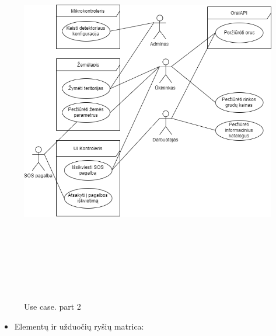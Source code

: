 \documentclass[oneside]{VUMIFPSkursinis}
\begin{document}
\begin{itemize}
\begin{figure}[H]
	\includegraphics[width=15cm,height=17cm,keepaspectratio]{UseCase2.png}
	\caption{Use case. part 2}
	\label{fig:UseCaseFull}
\end{figure}
\end{itemize}
\begin{itemize}
		\item Elementų ir užduočių ryšių matrica:
\end{itemize}
\pagebreak
\end{document}
